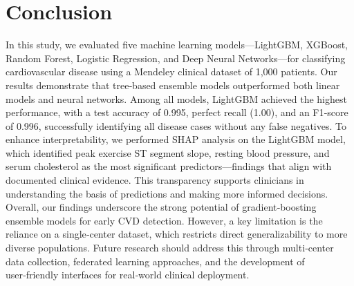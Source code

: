 \documentclass[twoside]{article}
\begin{document}
\section{Conclusion}
In this study, we evaluated five machine learning models—LightGBM, XGBoost, Random Forest, Logistic Regression, and Deep Neural Networks—for classifying cardiovascular disease using a Mendeley clinical dataset of 1,000 patients. Our results demonstrate that tree‑based ensemble models outperformed both linear models and neural networks. Among all models, LightGBM achieved the highest performance, with a test accuracy of 0.995, perfect recall (1.00), and an F1‑score of 0.996, successfully identifying all disease cases without any false negatives. To enhance interpretability, we performed SHAP analysis on the LightGBM model, which identified peak exercise ST segment slope, resting blood pressure, and serum cholesterol as the most significant predictors—findings that align with documented clinical evidence. This transparency supports clinicians in understanding the basis of predictions and making more informed decisions. Overall, our findings underscore the strong potential of gradient‑boosting ensemble models for early CVD detection. However, a key limitation is the reliance on a single‑center dataset, which restricts direct generalizability to more diverse populations. Future research should address this through multi‑center data collection, federated learning approaches, and the development of user‑friendly interfaces for real‑world clinical deployment.
\end{document}
